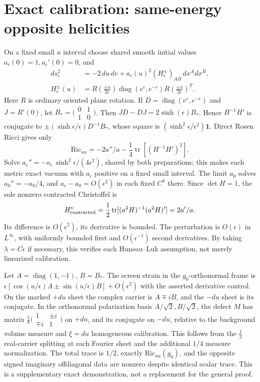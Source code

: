 \documentclass[11pt]{article}
\begin{document}
\section{Exact calibration: same-energy opposite helicities}
On a fixed small \(u\) interval choose shared smooth initial values \(a_\epsilon(0)=1,a_\epsilon'(0)=0\), and
\[
 \begin{aligned}
 ds_\epsilon^2&=-2\,du\,dv+a_\epsilon(u)^2 (H_\epsilon^\pm)_{AB}\,dx^A dx^B,\\
 H_\epsilon^\pm(u)&=R\!\left(\frac{\pm u}{2\epsilon}\right)
 \operatorname{diag}(e^\epsilon,e^{-\epsilon})R\!\left(\frac{\pm u}{2\epsilon}\right)^T .
 \end{aligned}
\]
Here \(R\) is ordinary oriented plane rotation. If \(D=\operatorname{diag}(e^\epsilon,e^{-\epsilon})\) and \(J=R'(0)\), let \(B_*=\bigl(\begin{smallmatrix}0&1\\1&0\end{smallmatrix}\bigr)\). Then \(JD-DJ=2\sinh(\epsilon)B_*\).
Hence \(H^{-1}H'\) is conjugate to \(\pm(\sinh\epsilon/\epsilon)D^{-1}B_*\), whose square is \((\sinh^2\epsilon/\epsilon^2)\mathbf1\). Direct Rosen Ricci gives only
\[
\mathrm{Ric}_{uu}=-2a''/a-\frac14\operatorname{tr}[(H^{-1}H')^2].
\]
Solve \(a_\epsilon''=-a_\epsilon\,\sinh^2\epsilon/(4\epsilon^2)\), shared by both preparations; this makes each metric exact vacuum with \(a_\epsilon\) positive on a fixed small interval. The limit \(a_0\) solves \(a_0''=-a_0/4\), and \(a_\epsilon-a_0=O(\epsilon^2)\) in each fixed \(C^k\) there. Since \(\det H=1\), the sole nonzero contracted Christoffel is
\[
H_{\rm contracted}^v=\frac12\operatorname{tr}[(a^2H)^{-1}(a^2H)']=2a'/a .
\]
Its difference is \(O(\epsilon^2)\), its derivative is bounded. The perturbation is \(O(\epsilon)\) in \(L^\infty\), with uniformly bounded first and \(O(\epsilon^{-1})\) second derivatives. By taking \(\lambda=C\epsilon\) if necessary, this verifies each Huneau--Luk assumption, not merely linearized calibration.

Let \(A=\operatorname{diag}(1,-1)\), \(B=B_*\). The screen strain in the \(g_0\)-orthonormal frame is \(\epsilon[\cos(u/\epsilon)A\pm\sin(u/\epsilon)B]+O(\epsilon^2)\) with the asserted derivative control. On the marked \(+du\) sheet the complex carrier is \(A\mp iB\), and the \(-du\) sheet is its conjugate. In the orthonormal polarization basis \(A/\sqrt2,B/\sqrt2\), the defect \(M\) has matrix \(\frac18\bigl(\begin{smallmatrix}1&\pm i\\\mp i&1\end{smallmatrix}\bigr)\) on \(+du\), and its conjugate on \(-du\), relative to the background volume measure and \(\xi=du\) homogeneous calibration. This follows from the \(\frac12\) real-carrier splitting at each Fourier sheet and the additional \(1/4\) measure normalization. The total trace is \(1/2\), exactly \(\mathrm{Ric}_{uu}(g_0)\), and the opposite signed imaginary offdiagonal data are nonzero despite identical scalar trace. This is a supplementary exact demonstration, not a replacement for the general proof.
\end{document}
